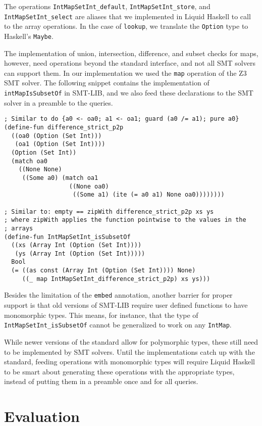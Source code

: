 \documentclass[sigconf, review]{acmart}
\newcommand{\tc}[1]{{\small\texttt{#1}}}
\begin{document}
The operations \tc{IntMapSetInt\_default}, \tc{IntMapSetInt\_store}, and \tc{IntMapSetInt\_select}
are aliases that we implemented in Liquid Haskell to call to the array operations.
In the case of \tc{lookup}, we translate the \tc{Option} type to Haskell's \tc{Maybe}.

The implementation of union, intersection,
difference, and subset checks for maps, however,
need operations beyond the standard interface, and not all SMT solvers can support
them. In our implementation we used the \tc{map} operation of the
Z3 SMT solver. The following snippet contains the implementation of
\tc{intMapIsSubsetOf} in SMT-LIB, and we also feed these declarations to the
SMT solver in a preamble to the queries.

\begin{verbatim}
; Similar to do {a0 <- oa0; a1 <- oa1; guard (a0 /= a1); pure a0}
(define-fun difference_strict_p2p
  ((oa0 (Option (Set Int)))
   (oa1 (Option (Set Int))))
  (Option (Set Int))
  (match oa0
    ((None None)
     ((Some a0) (match oa1
                  ((None oa0)
                   ((Some a1) (ite (= a0 a1) None oa0))))))))

; Similar to: empty == zipWith difference_strict_p2p xs ys
; where zipWith applies the function pointwise to the values in the
; arrays
(define-fun IntMapSetInt_isSubsetOf
  ((xs (Array Int (Option (Set Int))))
   (ys (Array Int (Option (Set Int)))))
  Bool
  (= ((as const (Array Int (Option (Set Int)))) None)
     ((_ map IntMapSetInt_difference_strict_p2p) xs ys)))
\end{verbatim}

Besides the limitation of the \tc{embed} annotation, another barrier for
proper support is that old versions of SMT-LIB require user defined
functions to have monomorphic types. This means, for instance, that
the type of \tc{IntMapSetInt\_isSubsetOf} cannot be generalized to work
on any \tc{IntMap}.

While newer versions of the standard allow
for polymorphic types, these still need to be implemented by SMT solvers.
Until the implementations catch up with the standard, feeding operations with
monomorphic types will require Liquid Haskell to be smart about generating
these operations with the appropriate types, instead of putting them in a
preamble once and for all queries.


\section{Evaluation}
\label{evaluation}
\end{document}
